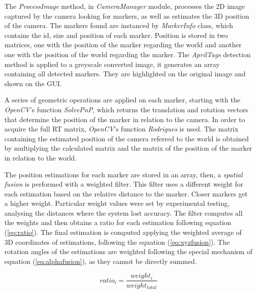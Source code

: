 \documentclass{styles/svproc}
\begin{document}
	
	
	The \textit{ProcessImage} method, in \textit{CameraManager} module, processes the 2D image captured by the camera looking for markers, as well as estimates the 3D position of the camera. The markers found are instanced by \textit{MarkerInfo} class, which contains the id, size and position of each marker. Position is stored in two matrices, one with the position of the marker regarding the world and another one with the position of the world regarding the marker. The \textit{AprilTags} detection method is applied to a greyscale converted image, it generates an array containing all detected markers. They are highlighted on the original image and shown on the GUI.
	
	A series of geometric operations are applied on each marker, starting with the \textit{OpenCV}'s function \textit{SolvePnP}, which returns the translation and rotation vectors that determine the position of the marker in relation to the camera. In order to acquire the full RT matrix, \textit{OpenCV}'s function \textit{Rodrigues} is used. The matrix containing the estimated position of the camera referred to the world is obtained by multiplying the calculated matrix and the matrix of the position of the marker in relation to the world.
	
	The position estimations for each marker are stored in an array, then, a \textit{spatial fusion} is performed with a weighted filter. This filter uses a different weight for each estimation based on the relative distance to the marker. Closer markers get a higher weight. Particular weight values were set by experimental testing, analysing the distances where the system lost accuracy. The filter computes all the weights and then obtains a ratio for each estimation following equation (\ref{eq:ratio}). The final estimation is computed applying the weighted average of 3D coordinates of estimations, following the equation (\ref{eq:xyzfusion}). The rotation angles of the estimations are weighted following the special mechanism of equation (\ref{eq:alphafusion}), as they cannot be directly summed.
	
	\begin{equation}
	ratio_{i} = \frac{weight_{i}}{weight_{total}}
	\label{eq:ratio}
	\end{equation}
	
\end{document}
